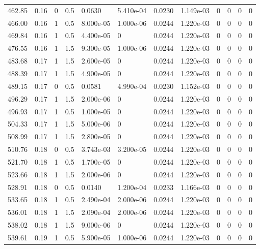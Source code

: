 \documentclass[preview]{standalone}
\begin{document}
{{{{\begin{tabular}{L{1.2cm}C{1.2cm} C{0.3cm}C{0.5cm} C{1.4cm}C{1.4cm} C{1.4cm}C{1.4cm} C{1.6cm}C{1.6cm} C{1.6cm}C{1.6cm}}
  462.85  &  0.16  & 0     & 0.5 &  0.0630  & 5.410e-04  &  0.0230&   1.149e-03& 0 & 0   &  0 & 0  \\ 
  466.00  &  0.16  & 1     & 0.5 &  8.000e-05  & 1.000e-06  &  0.0244&   1.220e-03& 0 & 0   &  0 & 0  \\ 
  469.84  &  0.16  & 1     & 0.5 &  4.400e-05  & 0  &  0.0244&   1.220e-03& 0 & 0   &  0 & 0  \\ 
  476.55  &  0.16  & 1     & 1.5 &  9.300e-05  & 1.000e-06  &  0.0244&   1.220e-03& 0 & 0   &  0 & 0  \\ 
  483.68  &  0.17  & 1     & 1.5 &  2.600e-05  & 0  &  0.0244&   1.220e-03& 0 & 0   &  0 & 0  \\ 
  488.39  &  0.17  & 1     & 1.5 &  4.900e-05  & 0  &  0.0244&   1.220e-03& 0 & 0   &  0 & 0  \\ 
  489.15  &  0.17  & 0     & 0.5 &  0.0581  & 4.990e-04  &  0.0230&   1.152e-03& 0 & 0   &  0 & 0  \\ 
  496.29  &  0.17  & 1     & 1.5 &  2.000e-06  & 0  &  0.0244&   1.220e-03& 0 & 0   &  0 & 0  \\ 
  496.93  &  0.17  & 1     & 0.5 &  1.000e-05  & 0  &  0.0244&   1.220e-03& 0 & 0   &  0 & 0  \\ 
  504.33  &  0.17  & 1     & 1.5 &  5.000e-06  & 0  &  0.0244&   1.220e-03& 0 & 0   &  0 & 0  \\ 
  508.99  &  0.17  & 1     & 1.5 &  2.800e-05  & 0  &  0.0244&   1.220e-03& 0 & 0   &  0 & 0  \\ 
  510.76  &  0.18  & 0     & 0.5 &  3.743e-03  & 3.200e-05  &  0.0244&   1.220e-03& 0 & 0   &  0 & 0  \\ 
  521.70  &  0.18  & 1     & 0.5 &  1.700e-05  & 0  &  0.0244&   1.220e-03& 0 & 0   &  0 & 0  \\ 
  523.66  &  0.18  & 1     & 1.5 &  2.000e-06  & 0  &  0.0244&   1.220e-03& 0 & 0   &  0 & 0  \\ 
  528.91  &  0.18  & 0     & 0.5 &  0.0140  & 1.200e-04  &  0.0233&   1.166e-03& 0 & 0   &  0 & 0  \\ 
  533.65  &  0.18  & 1     & 0.5 &  2.490e-04  & 2.000e-06  &  0.0244&   1.220e-03& 0 & 0   &  0 & 0  \\ 
  536.01  &  0.18  & 1     & 1.5 &  2.090e-04  & 2.000e-06  &  0.0244&   1.220e-03& 0 & 0   &  0 & 0  \\ 
  538.02  &  0.18  & 1     & 1.5 &  9.000e-06  & 0  &  0.0244&   1.220e-03& 0 & 0   &  0 & 0  \\ 
  539.61  &  0.19  & 1     & 0.5 &  5.900e-05  & 1.000e-06  &  0.0244&   1.220e-03& 0 & 0   &  0 & 0  \\ 

\end{tabular}}}}}
\end{document}
